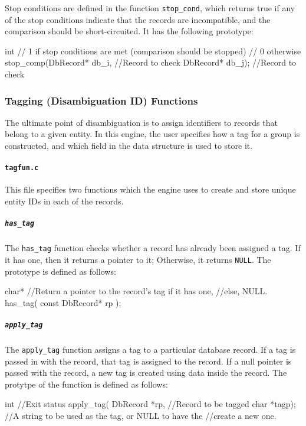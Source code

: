 \documentclass[10pt, letterpaper]{article}
\begin{document}
Stop conditions are defined in the function {\texttt{stop\_cond}}, which returns true if any of the stop
conditions indicate that the records are incompatible, and the comparison should be short-circuited. It
has the following prototype:
\begin{verbatimtab}
int                         // 1 if stop conditions are met (comparison should be stopped)
                            // 0 otherwise
stop_comp(DbRecord* db_i,   //Record to check 
          DbRecord* db_j);  //Record to check
\end{verbatimtab}

\subsubsection{Tagging (Disambiguation ID) Functions}
The ultimate point of disambiguation is to assign identifiers to records that belong to a given entity.
In this engine, the user specifies how a tag for a group is constructed, and which field in the data structure is used to store it.
\paragraph{\texttt{tagfun.c}}
This file specifies two functions which the engine uses to create and store unique entity IDs in each of the records.
\subparagraph{\texttt{has\_tag}}
The \texttt{has\_tag} function checks whether a record has already been assigned a tag. If it has one, then it returns a pointer to it;
Otherwise, it returns \texttt{NULL}. The prototype is defined as follows:
\begin{verbatimtab}
char*                           //Return a pointer to the record's tag if it has one,
                                //else, NULL.
has_tag( const DbRecord* rp );
\end{verbatimtab}
\subparagraph{\texttt{apply\_tag}}
The \texttt{apply\_tag} function assigns a tag to a particular database record. If a tag is passed in with
the record, that tag is assigned to the record. If a null pointer is passed with the record, a new tag is
created using data inside the record. The protytpe of the function is defined as follows:
\begin{verbatimtab}
int                         //Exit status
apply_tag( DbRecord *rp,    //Record to be tagged
           char *tagp);     //A string to be used as the tag, or NULL to have the
                            //create a new one.
\end{verbatimtab}
\end{document}
